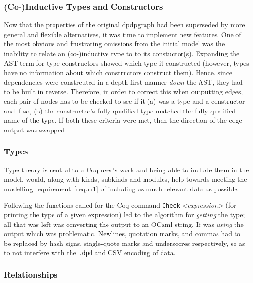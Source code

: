 \subsubsection{(Co-)Inductive Types and Constructors}

Now that the properties of the original dpdpgraph had been superseded by more
general and flexible alternatives, it was time to implement new features.  One
of the most obvious and frustrating omissions from the initial model was the
inability to relate an (co-)inductive type to to its constuctor(s). Expanding the
AST term for type-constructors showed which type it constructed (however, types
have no information about which constructors construct them). Hence, since
dependencies were constrcuted in a depth-first manner \emph{down} the AST, they
had to be built in reverse. Therefore, in order to correct this when outputting
edges, each pair of nodes has to be checked to see if it (a) was a type and a
constructor and if so, (b) the constructor's fully-qualified type matched the
fully-qualified name of the type. If both these criteria were met, then the
direction of the edge output was swapped.

\subsubsection{Types}

Type theory is central to a Coq user's work and being
able to include them in the model, would, along with kinds, subkinds and
modules, help towards meeting the modelling requirement~\ref{req:m1} of
including as much relevant data as possible. 

Following the functions called for the Coq command \texttt{Check}
\emph{<expression>} (for printing the type of a given expression) led to the
algorithm for \emph{getting} the type; all that was left was converting the
output to an OCaml string. It was \emph{using} the output which was problematic.
Newlines, quotation marks, and commas had to be replaced by hash signs,
single-quote marks and underscores respectively, so as to not interfere with the
\texttt{.dpd} and CSV encoding of data.

\subsubsection{Relationships}

